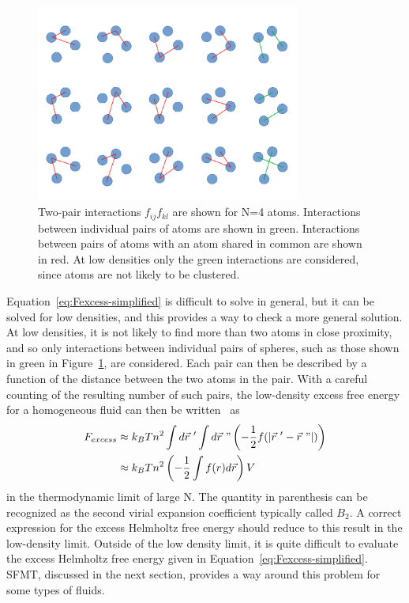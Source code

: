 \documentclass[double,12pt]{beavtex}
\begin{document}
  \begin{figure}
    \centering
    \includegraphics[height=6.5cm]{figs/diagrammic.pdf}
    \caption{Two-pair interactions $f_{ij}f_{kl}$ are shown for N=4 atoms. 
    Interactions between individual pairs of atoms are shown in green. 
    Interactions between pairs of atoms with an atom shared in common 
    are shown in red. At low densities only the green interactions
    are considered, since atoms are not likely to be clustered.}
    \label{fig:diagrammic}
  \end{figure}

Equation~\ref{eq:Fexcess-simplified} is difficult to solve in general, 
but it can be solved for low densities, and this provides a way to check
a more general solution.
At low densities, it is not likely to find more than two atoms in close 
proximity, and so only interactions between individual pairs of spheres, 
such as those shown in green in Figure~\ref{fig:diagrammic}, are considered.
Each pair can then be described by a function of the distance between the 
two atoms in the pair. 
With a careful counting of the resulting number of such pairs, the 
low-density excess free energy for a homogeneous fluid can then be 
written~\cite{schroeder} as
\begin{align}\label{eq:Fexcess}
    F_{excess} &\approx k_BTn^2\int d\vec {r}~'\int d\vec {r}~"\left(-\frac{1}{2}f(|\vec {r}~'-\vec {r}~"|)\right) \\
               &\approx k_BTn^2\left(-\frac{1}{2}\int{f(r)}{d\vec{r}}\right)V
\end{align} 
in the thermodynamic limit of large N. 
The quantity in parenthesis can be recognized 
as the second virial expansion coefficient typically called $B_2$. 
A correct expression for the excess Helmholtz free energy should 
reduce to this result in the low-density limit. 
Outside of the low density limit, it is quite difficult to evaluate the 
excess Helmholtz free energy given in Equation~\ref{eq:Fexcess-simplified}. 
SFMT, discussed in the next section, provides a way around this problem
for some types of fluids.
\end{document}

